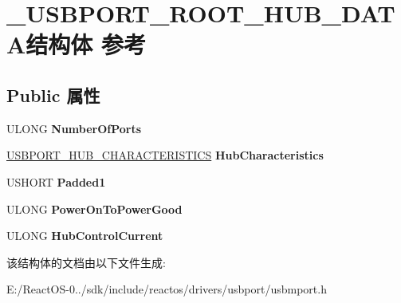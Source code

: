 \hypertarget{struct___u_s_b_p_o_r_t___r_o_o_t___h_u_b___d_a_t_a}{}\section{\+\_\+\+U\+S\+B\+P\+O\+R\+T\+\_\+\+R\+O\+O\+T\+\_\+\+H\+U\+B\+\_\+\+D\+A\+T\+A结构体 参考}
\label{struct___u_s_b_p_o_r_t___r_o_o_t___h_u_b___d_a_t_a}
\subsection*{Public 属性}
\begin{DoxyCompactItemize}
\item 
\mbox{\label{struct___u_s_b_p_o_r_t___r_o_o_t___h_u_b___d_a_t_a_aada2e8d7418c3373afe5518d031ce005}} 
U\+L\+O\+NG {\bfseries Number\+Of\+Ports}
\item 
\mbox{\label{struct___u_s_b_p_o_r_t___r_o_o_t___h_u_b___d_a_t_a_a92efb2045a86e13874fb8b502a634bae}} 
\hyperlink{union___u_s_b_p_o_r_t___h_u_b___c_h_a_r_a_c_t_e_r_i_s_t_i_c_s}{U\+S\+B\+P\+O\+R\+T\+\_\+\+H\+U\+B\+\_\+\+C\+H\+A\+R\+A\+C\+T\+E\+R\+I\+S\+T\+I\+CS} {\bfseries Hub\+Characteristics}
\item 
\mbox{\label{struct___u_s_b_p_o_r_t___r_o_o_t___h_u_b___d_a_t_a_a658c704fbbc7d2ca44377d1931892194}} 
U\+S\+H\+O\+RT {\bfseries Padded1}
\item 
\mbox{\label{struct___u_s_b_p_o_r_t___r_o_o_t___h_u_b___d_a_t_a_aa739e342167b700d4313ed2a961057d7}} 
U\+L\+O\+NG {\bfseries Power\+On\+To\+Power\+Good}
\item 
\mbox{\label{struct___u_s_b_p_o_r_t___r_o_o_t___h_u_b___d_a_t_a_a10da3d403838f32243c2576a60dcf557}} 
U\+L\+O\+NG {\bfseries Hub\+Control\+Current}
\end{DoxyCompactItemize}


该结构体的文档由以下文件生成\+:\begin{DoxyCompactItemize}
\item 
E\+:/\+React\+O\+S-\/0../sdk/include/reactos/drivers/usbport/usbmport.\+h\end{DoxyCompactItemize}
